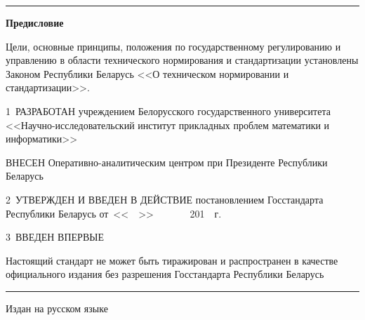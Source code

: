 \hrule 

\rule{0pt}{5mm}

\centerline{\bf Предисловие} 
Цели, основные принципы, положения по государственному регулированию и управлению в 
области технического нормирования и стандартизации установлены Законом Республики Беларусь
<<О техническом нормировании и стандартизации>>. 

\vskip0.2cm

1~РАЗРАБОТАН учреждением Белорусского государственного университета 
<<Научно-исследовательский институт прикладных проблем математики и 
информатики>>

ВНЕСЕН Оперативно-аналитическим центром при Президенте 
Республики Беларусь

2~УТВЕРЖДЕН И ВВЕДЕН В ДЕЙСТВИЕ постановлением Госстандарта Республики 
Беларусь от~<<$\phantom{\text{09}}$>> 
$\phantom{\text{января}}$~201$\phantom{\text{8}}$~г. 
\No~$\phantom{\text{9}}$ 

3~ВВЕДЕН ВПЕРВЫЕ

\vfill

Настоящий стандарт не может быть тиражирован и распространен в качестве 
официального издания без разрешения Госстандарта Республики Беларусь

\hrule
\vskip1mm
Издан на русском языке

\pagebreak
